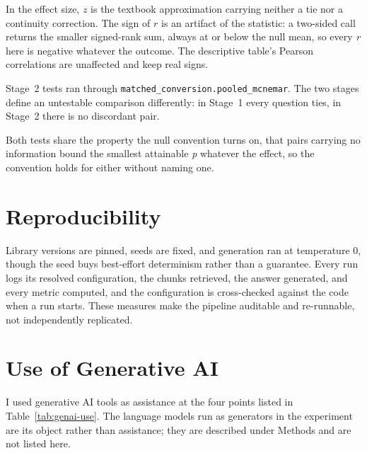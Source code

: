 In the effect size, $z$ is the textbook approximation carrying neither a tie
nor a continuity correction. The sign of $r$ is an artifact of the statistic: a
two-sided call returns the smaller signed-rank sum, always at or below the null
mean, so every \emph{r} here is negative whatever the outcome. The descriptive
table's Pearson correlations are unaffected and keep real signs.

Stage~2 tests ran through \texttt{matched\_conversion.\allowbreak{}pooled\_mcnemar}. The two
stages define an untestable comparison differently: in Stage~1 every question
ties, in Stage~2 there is no discordant pair.

Both tests share the property the null convention turns on, that pairs
carrying no information bound the smallest attainable \emph{p} whatever the
effect, so the convention holds for either without naming one.

\section{Reproducibility}

Library versions are pinned, seeds are fixed, and generation ran at temperature
0, though the seed buys best-effort determinism rather than a guarantee. Every
run logs its resolved configuration, the chunks retrieved, the answer generated,
and every metric computed, and the configuration is cross-checked against the
code when a run starts. These measures make the pipeline auditable and
re-runnable, not independently replicated.

\section{Use of Generative AI}

I used generative AI tools as assistance at the four points listed in
Table~\ref{tab:genai-use}. The language
models run as generators in the experiment are its object rather than
assistance; they are described under Methods and are not listed here.


